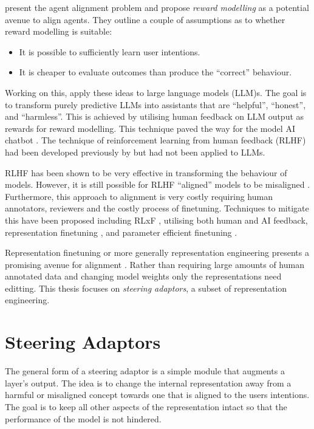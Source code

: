 \citet{agent-alignment} present the agent alignment problem and propose \emph{reward modelling} as a potential avenue to align agents.
They outline a couple of assumptions as to whether reward modelling is suitable:
\begin{itemize}[nolistsep]
    \item It is possible to sufficiently learn user intentions.
    \item It is cheaper to evaluate outcomes than produce the ``correct'' behaviour.
\end{itemize}
Working on this, \citet{rlhf} apply these ideas to large language models (LLM)s.
The goal is to transform purely predictive LLMs into assistants that are ``helpful'', ``honest'', and ``harmless''.
This is achieved by utilising human feedback on LLM output as rewards for reward modelling.
This technique paved the way for the model AI chatbot \citep{chatgpt}.
The technique of reinforcement learning from human feedback (RLHF) had been developed previously by \citet{rlhf-orig} but had not been applied to LLMs.

RLHF has been shown to be very effective in transforming the behaviour of models.
However, it is still possible for RLHF ``aligned'' models to be misaligned \citep{misgeneralization, c.ai}.
Furthermore, this approach to alignment is very costly requiring human annotators, reviewers and the costly process of finetuning.
Techniques to mitigate this have been proposed including RLxF \citep{alignment-survey}, utilising both human and AI feedback, representation finetuning \citep{reft}, and parameter efficient finetuning \citep{peft}.

Representation finetuning or more generally representation engineering \citep{steering-taxonomy} presents a promising avenue for alignment \citep{steering-clear, steering-theory, steering-taxonomy}.
Rather than requiring large amounts of human annotated data and changing model weights only the representations need editting.
This thesis focuses on \emph{steering adaptors}, a subset of representation engineering.

\section{Steering Adaptors}

The general form of a steering adaptor is a simple module that augments a layer's output.
The idea is to change the internal representation away from a harmful or misaligned concept towards one that is aligned to the users intentions.
The goal is to keep all other aspects of the representation intact so that the performance of the model is not hindered.

